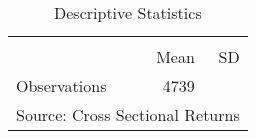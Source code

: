 \begin{table}[htbp]\centering
\def\sym#1{\ifmmode^{#1}\else\(^{#1}\)\fi}
\caption{Descriptive Statistics}
\begin{tabular}{l*{1}{rr}}
\toprule
                    &\multicolumn{2}{c}{}     \\
                    &        Mean&          SD\\
\midrule
\midrule
Observations        &        4739&            \\
\bottomrule
\multicolumn{3}{l}{\footnotesize Source: Cross Sectional Returns}\\
\end{tabular}
\end{table}

